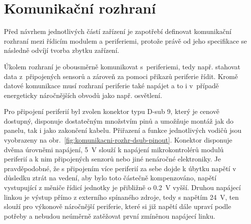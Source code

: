 \section{Komunikační rozhraní}
\label{sec:komunikacni-rozhrani}
    Před návrhem jednotlivých částí zařízení je zapotřebí definovat komunikační rozhraní mezi řídicím modulem a periferiemi, protože právě od jeho specifikace se následně odvíjí tvorba zbytku zařízení. 

    Úkolem rozhraní je obousměrně komunikovat s~periferiemi, tedy např. stahovat data z~připojených sensorů a zároveň za pomoci přikazů periferie řídit. Kromě datové komunikace musí rozhraní periferie také napájet a to i v~případě energeticky náročnějších obvodů jako např. osvětlení. 

    Pro připojení periferií byl zvolen konektor typu D-sub 9, který je cenově dostupný, disponuje dostatečným množstvím pinů a umožňuje montáž jak do panelu, tak i jako zakončení kabelu. Přiřazení a funkce jednotlivých vodičů jsou vyobrazeny na obr.~\ref{fig:komunikacni-rozhr-dsub-pinout}. Konektor disponuje dvěma úrovněmi napájení, \qty{5}{V} slouží k napájení mikrokontrolérů modulů periferií a k nim připojených senzorů nebo jiné nenáročné elektroniky. Je pravděpodobné, že s připojením více periferií za sebe dojde k úbytku napětí v důsledku ztrát na vedení, aby bylo toto částečně kompenzováno, napětí vystupující z měniče řídicí jednotky je přibližně o \qty{0.2}{V} vyšší. Druhou napájecí linkou je výstup přímo z externího spínaného zdroje, tedy s napětím \qty{24}{V}, ten slouží pro výkonově náročnější periferie, které si již napětí dále upraví podle potřeby a nebudou neúměrně zatěžovat první zmíněnou napájecí linku.


